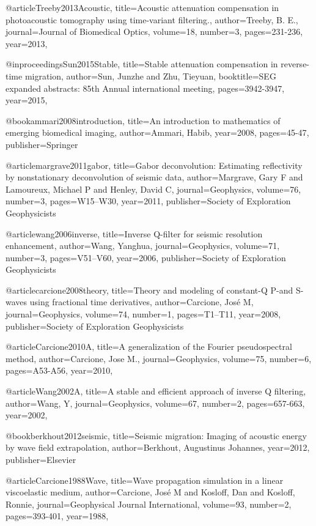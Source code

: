 @article{Treeby2013Acoustic,
  title={Acoustic attenuation compensation in photoacoustic tomography using time-variant filtering.},
  author={Treeby, B. E.},
  journal={Journal of Biomedical Optics},
  volume={18},
  number={3},
  pages={231-236},
  year={2013},
}

@inproceedings{Sun2015Stable,
  title={Stable attenuation compensation in reverse-time migration},
  author={Sun, Junzhe and Zhu, Tieyuan},
  booktitle={SEG expanded abstracts: 85th Annual international meeting},
  pages={3942-3947},
  year={2015},
}

@book{ammari2008introduction,
  title={An introduction to mathematics of emerging biomedical imaging},
  author={Ammari, Habib},
  year={2008},
  pages={45-47},
  publisher={Springer}
}


@article{margrave2011gabor,
  title={Gabor deconvolution: Estimating reflectivity by nonstationary deconvolution of seismic data},
  author={Margrave, Gary F and Lamoureux, Michael P and Henley, David C},
  journal={Geophysics},
  volume={76},
  number={3},
  pages={W15--W30},
  year={2011},
  publisher={Society of Exploration Geophysicists}
}

@article{wang2006inverse,
  title={Inverse {Q}-filter for seismic resolution enhancement},
  author={Wang, Yanghua},
  journal={Geophysics},
  volume={71},
  number={3},
  pages={V51--V60},
  year={2006},
  publisher={Society of Exploration Geophysicists}
}

@article{carcione2008theory,
  title={Theory and modeling of constant-{Q} {P}-and {S}-waves using fractional time derivatives},
  author={Carcione, Jos{\'e} M},
  journal={Geophysics},
  volume={74},
  number={1},
  pages={T1--T11},
  year={2008},
  publisher={Society of Exploration Geophysicists}
}


@article{Carcione2010A,
  title={A generalization of the {F}ourier pseudospectral method},
  author={Carcione, Jose M.},
  journal={Geophysics},
  volume={75},
  number={6},
  pages={A53-A56},
  year={2010},
}

@article{Wang2002A,
  title={A stable and efficient approach of inverse {Q} filtering},
  author={Wang, Y},
  journal={Geophysics},
  volume={67},
  number={2},
  pages={657-663},
  year={2002},
}

@book{berkhout2012seismic,
  title={Seismic migration: Imaging of acoustic energy by wave field extrapolation},
  author={Berkhout, Augustinus Johannes},
  year={2012},
  publisher={Elsevier}
}

@article{Carcione1988Wave,
  title={Wave propagation simulation in a linear viscoelastic medium},
  author={Carcione, José M and Kosloff, Dan and Kosloff, Ronnie},
  journal={Geophysical Journal International},
  volume={93},
  number={2},
  pages={393-401},
  year={1988},
}

